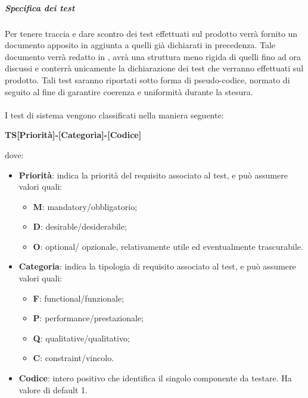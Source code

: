             \subparagraph{Specifica dei test}
            Per tenere traccia e dare scontro dei test effettuati sul prodotto verrà fornito un documento apposito in aggiunta a quelli già dichiarati in precedenza. Tale documento verrà redatto in , avrà una struttura meno rigida di quelli fino ad ora discussi e conterrà unicamente la dichiarazione dei test che verranno effettuati sul prodotto.
            Tali test saranno riportati sotto forma di pseudo-codice, normato di seguito al fine di garantire coerenza e uniformità durante la stesura.
            \\\\
            I test di sistema vengono classificati nella maniera seguente:
            \begin{center}
                \textbf{TS[Priorità]-[Categoria]-[Codice]}
            \end{center}
            dove:\\
            \begin{itemize}
                \item \textbf{Priorità}: indica la priorità del requisito associato al test, e può assumere valori quali:
                \begin{itemize}
                    \item \textbf{M}: mandatory/obbligatorio;
                    \item \textbf{D}: desirable/desiderabile;
                    \item \textbf{O}: optional/ opzionale, relativamente utile ed eventualmente trascurabile.
                \end{itemize}
                \item \textbf{Categoria}: indica la tipologia di requisito associato al test, e può assumere valori quali:
                \begin{itemize}
                    \item \textbf{F}: functional/funzionale;
                    \item \textbf{P}: performance/prestazionale;
                    \item \textbf{Q}: qualitative/qualitativo;
                    \item \textbf{C}: constraint/vincolo.
                \end{itemize}
                \item \textbf{Codice}: intero positivo che identifica il singolo componente da testare. Ha valore di default 1.
            \end{itemize}

